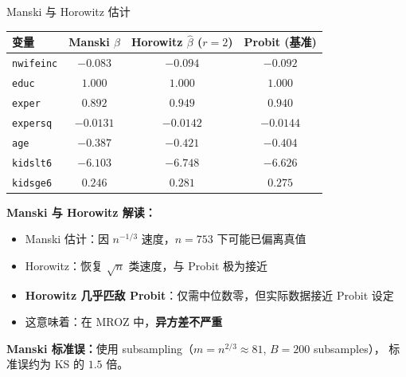 \documentclass[aspectratio=169, 10pt]{beamer}
\begin{document}
\begin{frame}{Manski 与 Horowitz 估计}

  \begin{center}\footnotesize
  \begin{tabular}{l|c|c|c}
  \hline
  变量 & Manski $\hat\beta$ & Horowitz $\hat\beta$ ($r=2$) & Probit (基准) \\
  \hline
  \texttt{nwifeinc} & $-0.083$ & $-0.094$ & $-0.092$ \\
  \texttt{educ} & $1.000$ & $1.000$ & $1.000$ \\
  \texttt{exper} & $0.892$ & $0.949$ & $0.940$ \\
  \texttt{expersq} & $-0.0131$ & $-0.0142$ & $-0.0144$ \\
  \texttt{age} & $-0.387$ & $-0.421$ & $-0.404$ \\
  \texttt{kidslt6} & $-6.103$ & $-6.748$ & $-6.626$ \\
  \texttt{kidsge6} & $0.246$ & $0.281$ & $0.275$ \\
  \hline
  \end{tabular}
  \end{center}

  \begin{highlightbox}
    \textbf{Manski 与 Horowitz 解读：}
    \begin{itemize}\setlength{\itemsep}{1pt}
      \item Manski 估计：因 $n^{-1/3}$ 速度，$n = 753$ 下可能已偏离真值
      \item Horowitz：恢复 $\sqrt{n}$ 类速度，与 Probit 极为接近
      \item \textbf{Horowitz 几乎匹敌 Probit}：仅需中位数零，但实际数据接近 Probit 设定
      \item 这意味着：在 MROZ 中，\textbf{异方差不严重}
    \end{itemize}
  \end{highlightbox}

  \begin{keybox}
    \textbf{Manski 标准误：}使用 subsampling（$m = n^{2/3} \approx 81$, $B = 200$ subsamples），
    标准误约为 KS 的 $1.5$ 倍。
  \end{keybox}

\end{frame}
\end{document}
